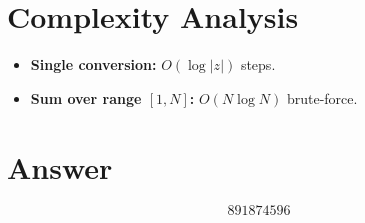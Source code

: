 \documentclass[11pt]{article}
\begin{document}
\section{Complexity Analysis}
\begin{itemize}
    \item \textbf{Single conversion:} $O(\log|z|)$ steps.
    \item \textbf{Sum over range $[1,N]$:} $O(N \log N)$ brute-force.
\end{itemize}

\section{Answer}

\[
\boxed{891874596}
\]
\end{document}
